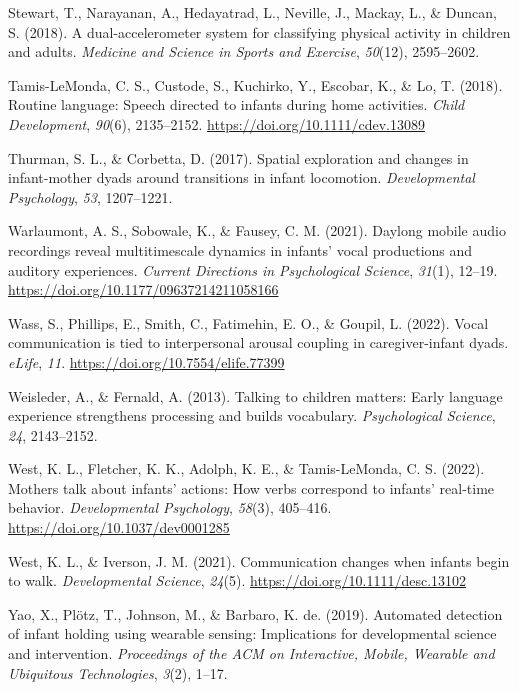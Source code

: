 \documentclass[
  man]{apa6}
\newlength{\cslhangindent}
\newlength{\cslentryspacingunit} %
\newenvironment{CSLReferences}[2] %
 {%
  \setlength{\parindent}{0pt}
  \ifodd #1
  \let\oldpar\par
  \def\par{\hangindent=\cslhangindent\oldpar}
  \fi
  \setlength{\parskip}{#2\cslentryspacingunit}
 }%
 {}
\begin{document}
\begin{CSLReferences}{1}{0}
\leavevmode{}%
Stewart, T., Narayanan, A., Hedayatrad, L., Neville, J., Mackay, L., \& Duncan, S. (2018). A dual-accelerometer system for classifying physical activity in children and adults. \emph{Medicine and Science in Sports and Exercise}, \emph{50}(12), 2595--2602.

\leavevmode{}%
Tamis-LeMonda, C. S., Custode, S., Kuchirko, Y., Escobar, K., \& Lo, T. (2018). Routine language: Speech directed to infants during home activities. \emph{Child Development}, \emph{90}(6), 2135--2152. \url{https://doi.org/10.1111/cdev.13089}

\leavevmode{}%
Thurman, S. L., \& Corbetta, D. (2017). Spatial exploration and changes in infant-mother dyads around transitions in infant locomotion. \emph{Developmental Psychology}, \emph{53}, 1207--1221.

\leavevmode{}%
Warlaumont, A. S., Sobowale, K., \& Fausey, C. M. (2021). Daylong mobile audio recordings reveal multitimescale dynamics in infants' vocal productions and auditory experiences. \emph{Current Directions in Psychological Science}, \emph{31}(1), 12--19. \url{https://doi.org/10.1177/09637214211058166}

\leavevmode{}%
Wass, S., Phillips, E., Smith, C., Fatimehin, E. O., \& Goupil, L. (2022). Vocal communication is tied to interpersonal arousal coupling in caregiver-infant dyads. \emph{{eLife}}, \emph{11}. \url{https://doi.org/10.7554/elife.77399}

\leavevmode{}%
Weisleder, A., \& Fernald, A. (2013). Talking to children matters: Early language experience strengthens processing and builds vocabulary. \emph{Psychological Science}, \emph{24}, 2143--2152.

\leavevmode{}%
West, K. L., Fletcher, K. K., Adolph, K. E., \& Tamis-LeMonda, C. S. (2022). Mothers talk about infants' actions: How verbs correspond to infants' real-time behavior. \emph{Developmental Psychology}, \emph{58}(3), 405--416. \url{https://doi.org/10.1037/dev0001285}

\leavevmode{}%
West, K. L., \& Iverson, J. M. (2021). Communication changes when infants begin to walk. \emph{Developmental Science}, \emph{24}(5). \url{https://doi.org/10.1111/desc.13102}

\leavevmode{}%
Yao, X., Plötz, T., Johnson, M., \& Barbaro, K. de. (2019). Automated detection of infant holding using wearable sensing: Implications for developmental science and intervention. \emph{Proceedings of the ACM on Interactive, Mobile, Wearable and Ubiquitous Technologies}, \emph{3}(2), 1--17.

\end{CSLReferences}
\end{document}
